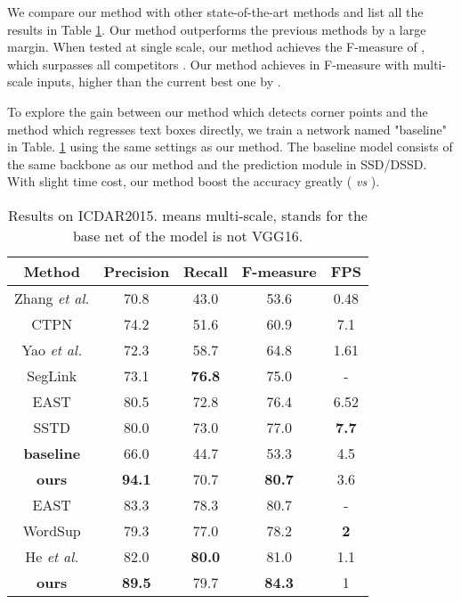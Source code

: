 \documentclass[10pt,twocolumn,letterpaper]{article}
\begin{document}
We compare our method with other state-of-the-art methods and list all the results in Table \ref{tab_icdar2015}. Our method outperforms the previous methods by a large margin. When tested at single scale, our method achieves the F-measure of , which surpasses all competitors \cite{zhang2016multi,tian2016detecting,yao2016scene,Shi_2017_CVPR,Zhou_2017_CVPR,SSTD} . Our method achieves  in F-measure with multi-scale inputs, higher than the current best one \cite{He_2017_ICCV} by .



To explore the gain between our method which detects corner points and the method which regresses text boxes directly, we train a network named "baseline" in Table. \ref{tab_icdar2015} using the same settings as our method. The baseline model consists of the same backbone as our method and the prediction module in SSD/DSSD. With slight time cost, our method boost the accuracy greatly ( \emph{vs} ).

\begin{table}
\small

\begin{centering}
\begin{tabular}{|c|c|c|c|c|}
\hline 
\textbf{Method} & \textbf{Precision} & \textbf{Recall} & \textbf{F-measure} & \textbf{FPS} \tabularnewline
\hline 
\hline 
Zhang \emph{et al.} \cite{zhang2016multi} & 70.8 & 43.0 & 53.6 & 0.48 \tabularnewline
\hline 
CTPN \cite{tian2016detecting} & 74.2  & 51.6  & 60.9 & 7.1 \tabularnewline
\hline 
Yao \emph{et al.} \cite{yao2016scene} & 72.3  & 58.7  & 64.8 & 1.61 \tabularnewline



\hline 
SegLink \cite{Shi_2017_CVPR} & 73.1  & \textbf{76.8} & 75.0 & - \tabularnewline
\hline 
EAST \cite{Zhou_2017_CVPR} & 80.5  & 72.8 & 76.4 & 6.52\tabularnewline
\hline 
SSTD \cite{SSTD} & 80.0  & 73.0 & 77.0 & \textbf{7.7} \tabularnewline

\hline
\textbf{baseline} & 66.0 & 44.7 & 53.3 & 4.5 \tabularnewline

\hline
\textbf{ours} & \textbf{94.1} & 70.7 & \textbf{80.7} & 3.6 \tabularnewline
\hline 
\hline 
EAST   \cite{Zhou_2017_CVPR}& 83.3  & 78.3 & 80.7 & - \tabularnewline
\hline
WordSup  \cite{Hu_2017_ICCV} & 79.3  & 77.0  & 78.2 & \textbf{2} \tabularnewline
\hline 
He \emph{et al.}   \cite{He_2017_ICCV} & 82.0  &  \textbf{80.0} & 81.0 & 1.1 \tabularnewline
\hline 
\textbf{ours} & \textbf{89.5} & 79.7 & \textbf{84.3} & 1 \tabularnewline
\hline
\end{tabular}
\par\end{centering}
\caption{Results on ICDAR2015.  means multi-scale,  stands for the base net of the model is not VGG16.}
\label{tab_icdar2015}
\end{table}
\end{document}
